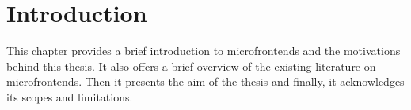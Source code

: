\chapter{Introduction}
\label{chap:Introduction} 
This chapter provides a brief introduction to microfrontends and the motivations behind this thesis. It also offers a brief overview of the existing literature on microfrontends. Then it presents the aim of the thesis and finally, it acknowledges its scopes and limitations.



